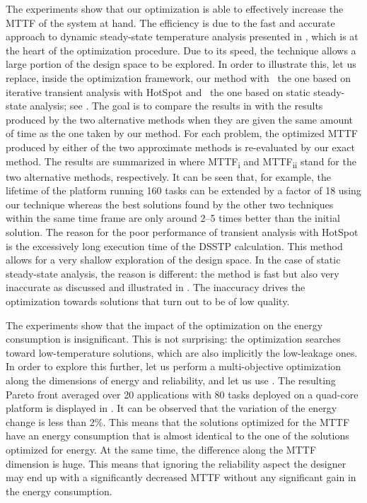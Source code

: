 The experiments show that our optimization is able to effectively increase the
\ac{MTTF} of the system at hand. The efficiency is due to the fast and accurate
approach to dynamic steady-state temperature analysis presented in
, which is at the heart of the optimization
procedure. Due to its speed, the technique allows a large portion of the design
space to be explored. In order to illustrate this, let us replace, inside the
optimization framework, our method with \one~the one based on iterative
transient analysis with HotSpot and \two~the one based on static steady-state
analysis; see . The goal is to compare the
results in  with the results produced by the two
alternative methods when they are given the same amount of time as the one taken
by our method. For each problem, the optimized \ac{MTTF} produced by either of
the two approximate methods is re-evaluated by our exact method. The results are
summarized in  where \ac{MTTF}\textsubscript{i}
and \ac{MTTF}\textsubscript{ii} stand for the two alternative methods,
respectively. It can be seen that, for example, the lifetime of the platform
running 160 tasks can be extended by a factor of 18 using our technique whereas
the best solutions found by the other two techniques within the same time frame
are only around 2--5 times better than the initial solution. The reason for the
poor performance of transient analysis with HotSpot is the excessively long
execution time of the \ac{DSSTP} calculation. This method allows for a very
shallow exploration of the design space. In the case of static steady-state
analysis, the reason is different: the method is fast but also very inaccurate
as discussed and illustrated in . The
inaccuracy drives the optimization towards solutions that turn out to be of low
quality.

The experiments show that the impact of the optimization on the energy
consumption is insignificant. This is not surprising: the optimization searches
toward low-temperature solutions, which are also implicitly the low-leakage
ones. In order to explore this further, let us perform a multi-objective
optimization along the dimensions of energy and reliability, and let us use
 \cite{deb2002}. The resulting Pareto front averaged over 20
applications with 80 tasks deployed on a quad-core platform is displayed in
. It can be observed that the variation of the
energy change is less than 2\%. This means that the solutions optimized for the
\ac{MTTF} have an energy consumption that is almost identical to the one of the
solutions optimized for energy. At the same time, the difference along the
\ac{MTTF} dimension is huge. This means that ignoring the reliability aspect the
designer may end up with a significantly decreased \ac{MTTF} without any
significant gain in the energy consumption.

